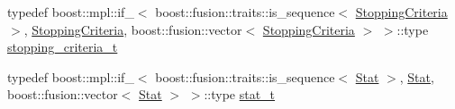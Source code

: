 \begin{DoxyCompactItemize}
\item 
typedef boost\+::mpl\+::if\+\_\+$<$ boost\+::fusion\+::traits\+::is\+\_\+sequence$<$ \hyperlink{classlimbo_1_1bayes__opt_1_1_bo_base_a06717d469296323cc277e3769b828e98}{Stopping\+Criteria} $>$, \hyperlink{classlimbo_1_1bayes__opt_1_1_bo_base_a06717d469296323cc277e3769b828e98}{Stopping\+Criteria}, boost\+::fusion\+::vector$<$ \hyperlink{classlimbo_1_1bayes__opt_1_1_bo_base_a06717d469296323cc277e3769b828e98}{Stopping\+Criteria} $>$ $>$\+::type \hyperlink{classlimbo_1_1bayes__opt_1_1_bo_base_a8dfcab20696e6c85665b150e9881c010}{stopping\+\_\+criteria\+\_\+t}
\item 
typedef boost\+::mpl\+::if\+\_\+$<$ boost\+::fusion\+::traits\+::is\+\_\+sequence$<$ \hyperlink{classlimbo_1_1bayes__opt_1_1_bo_base_adda0d6bf0fa0def996eb0af7e8a84f3f}{Stat} $>$, \hyperlink{classlimbo_1_1bayes__opt_1_1_bo_base_adda0d6bf0fa0def996eb0af7e8a84f3f}{Stat}, boost\+::fusion\+::vector$<$ \hyperlink{classlimbo_1_1bayes__opt_1_1_bo_base_adda0d6bf0fa0def996eb0af7e8a84f3f}{Stat} $>$ $>$\+::type \hyperlink{classlimbo_1_1bayes__opt_1_1_bo_base_a17d395abfdd3158f238c83764ba68fd0}{stat\+\_\+t}
\end{DoxyCompactItemize}
